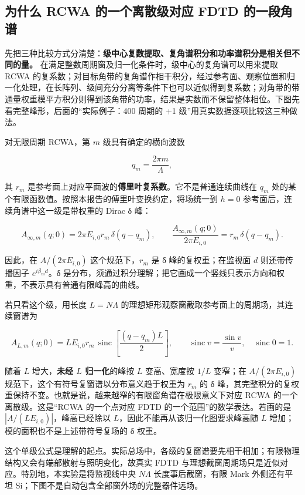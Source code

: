 \documentclass[
  chinese,
  UTF8,
  a4paper,
  11pt]{ctexart}
\begin{document}
\subsection{为什么 RCWA 的一个离散级对应 FDTD
的一段角谱}\label{ux4e3aux4ec0ux4e48-rcwa-ux7684ux4e00ux4e2aux79bbux6563ux7ea7ux5bf9ux5e94-fdtd-ux7684ux4e00ux6bb5ux89d2ux8c31}

先把三种比较方式分清楚：\textbf{级中心复数提取、复角谱积分和功率谱积分是相关但不同的量。}
在满足整数周期窗及归一化条件时，级中心的复角谱可以用来提取 RCWA
的复系数；对目标角带的复角谱作相干积分，经过参考面、观察位置和归一化处理，在长阵列、级间充分分离等条件下也可以近似得到复系数；对角带的带通量权重模平方积分则得到该角带的功率，结果是实数而不保留整体相位。下图先看完整峰形，后面的``实际例子：400
周期的 +1 级''用真实数据逐项比较这三种做法。

对无限周期 RCWA，第 \(m\) 级具有确定的横向波数

\[q_m=\frac{2\pi m}{\Lambda},\]

其 \(r_m\)
是参考面上对应平面波的\textbf{傅里叶复系数}。它不是普通连续曲线在
\(q_m\) 处的某个有限函数值。按照本报告的傅里叶变换约定，将场统一到
\(h=0\) 参考面后，连续角谱中这一级是带权重的 Dirac δ 峰：

\[A_{\infty,m}(q;0)=2\pi E_{i,0}r_m\,\delta(q-q_m),\qquad
\frac{A_{\infty,m}(q;0)}{2\pi E_{i,0}}=r_m\,\delta(q-q_m).\]

因此，在 \(A/(2\pi E_{i,0})\) 这个规范下，\(r_m\) 是 δ
峰的复权重；在监视面 \(d\) 则还带传播因子 \(e^{i\beta_m d}\)。δ
是分布，须通过积分理解；把它画成一个竖线只表示方向和权重，不表示具有普通有限峰高的曲线。

若只看这个级，用长度 \(L=N\Lambda\)
的理想矩形观察窗截取参考面上的周期场，其连续窗谱为

\[A_{L,m}(q;0)=L E_{i,0}r_m\,
\operatorname{sinc}\!\left[\frac{(q-q_m)L}{2}\right],\qquad
\operatorname{sinc}v=\frac{\sin v}{v},\quad \operatorname{sinc}0=1.\]

随着 \(L\) 增大，\textbf{未经 \(L\) 归一化}的峰按 \(L\) 变高、宽度按
\(1/L\) 变窄；在 \(A/(2\pi E_{i,0})\)
规范下，这个有符号复窗谱以分布意义趋于权重为 \(r_m\) 的 δ
峰，其完整积分的复权重保持不变。也就是说，越来越窄的有限窗角谱在极限意义下对应
RCWA 的一个离散级。这是``RCWA 的一个点对应 FDTD
的一个范围''的数学表达。若画的是 \(|A/(L E_{i,0})|\)，峰高已经除以
\(L\)，因此不能再从该归一化图要求峰高随 \(L\)
增加；模的面积也不是上述带符号复场的 δ 权重。

这个单级公式是理解的起点。实际总场中，各级的复窗谱要先相干相加；有限物理结构又会有端部散射与照明变化，故真实
FDTD 与理想截窗周期场只是近似对应。特别地，本实验是将监视线中央
\(N\Lambda\) 长度事后截窗，有限 Mark 外侧还有平坦
Si；下图不是自动包含全部窗外场的完整器件远场。
\end{document}
